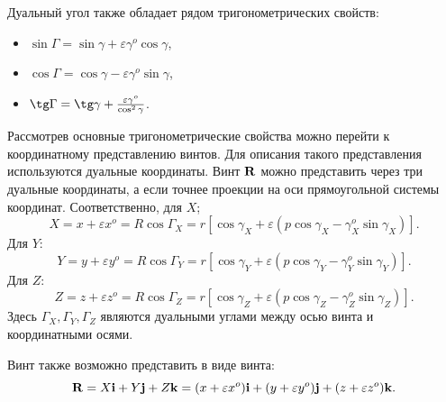 Дуальный угол также обладает рядом тригонометрических свойств:
\begin{itemize}
    \item $\sin \Gamma = \sin \gamma + \varepsilon \gamma^o \cos \gamma$,
    \item $\cos \Gamma = \cos \gamma - \varepsilon \gamma^o \sin \gamma$,
    \item $\tg \Gamma = \tg \gamma + \frac{\varepsilon \gamma^o}{\cos^2 \gamma}$.
\end{itemize}

Рассмотрев основные тригонометрические свойства можно перейти к координатному представлению винтов. Для описания такого представления используются дуальные координаты. Винт $\vb{R}$ можно представить через три дуальные координаты, а если точнее проекции на оси прямоугольной системы координат. Соответственно, для $X$;
\begin{equation*}
    X = x + \varepsilon x^o = R \cos \Gamma_X = r[\cos \gamma_X + \varepsilon (p \cos \gamma_X - \gamma_X^o \sin \gamma_X)].
\end{equation*}
Для $Y$:
\begin{equation*}
    Y = y + \varepsilon y^o = R \cos \Gamma_Y = r[\cos \gamma_Y + \varepsilon (p \cos \gamma_Y - \gamma_Y^o \sin \gamma_Y)].
\end{equation*}
Для $Z$:
\begin{equation*}
    Z = z + \varepsilon z^o = R \cos \Gamma_Z = r[\cos \gamma_Z + \varepsilon (p \cos \gamma_Z - \gamma_Z^o \sin \gamma_Z)].
\end{equation*}
Здесь $\Gamma_X, \Gamma_Y, \Gamma_Z$ являются дуальными углами между осью винта и координатными осями.

Винт также возможно представить в виде винта:
\begin{equation*}
    \vb{R} = X \vb{i} + Y \vb{j} + Z \vb{k} = (x + \varepsilon x^o)\vb{i} + (y + \varepsilon y^o)\vb{j} + (z + \varepsilon z^o)\vb{k}.
\end{equation*}

